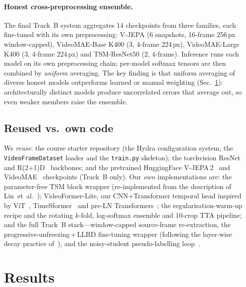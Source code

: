 \documentclass[10pt,twocolumn,letterpaper]{article}
\begin{document}
\paragraph{Honest cross-preprocessing ensemble.}
The final Track~B system aggregates 14 checkpoints from three families, each
fine-tuned with its own preprocessing: V-JEPA (6 snapshots, 16-frame 256\,px
window-capped), VideoMAE-Base K400 (3, 4-frame 224\,px), VideoMAE-Large K400 (3,
4-frame 224\,px) and TSM-ResNet50 (2, 4-frame). Inference runs each model on its
own preprocessing chain; per-model softmax tensors are then combined by
\emph{uniform} averaging. The key finding is that uniform averaging of diverse
honest models outperforms learned or manual weighting
(Sec.~\ref{sec:results}): architecturally distinct models produce uncorrelated
errors that average out, so even weaker members raise the ensemble.

\subsection{Reused vs.\ own code}
\label{sec:reuse}
We \emph{reuse}: the course starter repository (the Hydra configuration system,
the \texttt{VideoFrameDataset} loader and the \texttt{train.py} skeleton); the
torchvision ResNet~\cite{he2016resnet} and R(2+1)D~\cite{tran2018r2plus1d}
backbones; and the pretrained HuggingFace V-JEPA\,2~\cite{bardes2025vjepa2} and
VideoMAE~\cite{tong2022videomae} checkpoints (Track~B only). Our \emph{own}
implementations are: the parameter-free TSM block wrapper (re-implemented from
the description of Lin~et~al.~\cite{lin2019tsm}); VideoFormer-Lite, our
CNN+Transformer temporal head inspired by ViT~\cite{dosovitskiy2021vit},
TimeSformer~\cite{bertasius2021timesformer} and pre-LN
Transformers~\cite{xiong2020prenorm}; the regularisation-warm-up recipe and the
rotating $k$-fold, log-softmax ensemble and 10-crop TTA pipeline; and the full
Track~B stack---window-capped source-frame re-extraction, the
progressive-unfreezing\,+\,LLRD fine-tuning wrapper (following the layer-wise
decay practice of~\cite{howard2018ulmfit,clark2020electra,bao2022beit}), and the
noisy-student pseudo-labelling loop~\cite{xie2020noisystudent,lee2013pseudo}.

\section{Results}
\label{sec:results}
\end{document}

